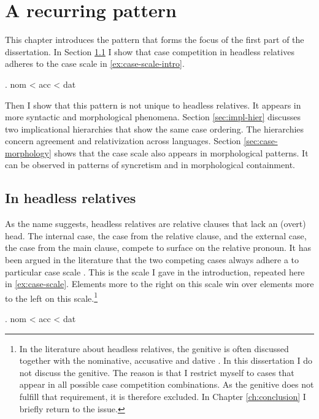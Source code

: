 
\chapter{A recurring pattern}\label{ch:recurring}

This chapter introduces the pattern that forms the focus of the first part of the dissertation. In Section \ref{sec:pattern-rels} I show that case competition in headless relatives adheres to the case scale in \ref{ex:case-scale-intro}.

\ex. \ac{nom} < \ac{acc} < \ac{dat}\label{ex:case-scale-intro}

Then I show that this pattern is not unique to headless relatives. It appears in more syntactic and morphological phenomena. Section \ref{sec:impl-hier} discusses two implicational hierarchies that show the same case ordering. The hierarchies concern agreement and relativization across languages. Section \ref{sec:case-morphology} shows that the case scale also appears in morphological patterns. It can be observed in patterns of syncretism and in morphological containment.


\section{In headless relatives}\label{sec:pattern-rels}

As the name suggests, headless relatives are relative clauses that lack an (overt) head. The internal case, the case from the relative clause, and the external case, the case from the main clause, compete to surface on the relative pronoun. It has been argued in the literature that the two competing cases always adhere a to particular case scale \citep[cf.][]{harbert1978,pittner1995,vogel2001,grosu2003,caha2019,bergsma2019}. This is the scale I gave in the introduction, repeated here in \ref{ex:case-scale}. Elements more to the right on this scale win over elements more to the left on this scale.\footnote{
In the literature about headless relatives, the genitive is often discussed together with the nominative, accusative and dative \citep[cf.][]{harbert1978,pittner1995}. In this dissertation I do not discuss the genitive. The reason is that I restrict myself to cases that appear in all possible case competition combinations. As the genitive does not fulfill that requirement, it is therefore excluded. In Chapter \ref{ch:conclusion} I briefly return to the issue.
}

\ex. \ac{nom} < \ac{acc} < \ac{dat}\label{ex:case-scale}

